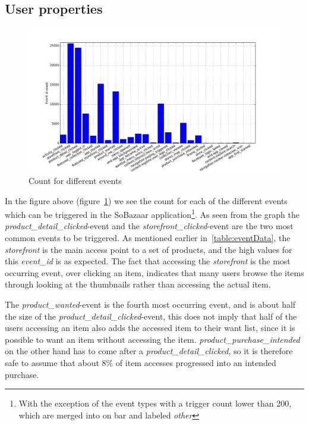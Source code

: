 \subsection{User properties}
    \begin{figure}[H]
        \includegraphics[width=5in]{image/event_iddistribution.png}
        \centering
        \caption{Count for different events}
    \label{figure:eventIDDistribution}
    \end{figure}
        In the figure above (figure~\ref{figure:eventIDDistribution}) we see the count for each of the different events which can be triggered in the SoBazaar application\footnote{With the exception of the event types with a trigger count lower than 200, which are merged into on bar and labeled \emph{other}}.
        As seen from the graph the \emph{product\_detail\_clicked}-event and the \emph{storefront\_clicked}-event are the two most common events to be triggered.
        As mentioned earlier in~\ref{table:eventData}, the \emph{storefront} is the main access point to a set of products, and the high values for this \emph{event\_id} is as expected.
        The fact that accessing the \emph{storefront} is the most occurring event, over clicking an item, indicates that many users browse the items through looking at the thumbnails rather than accessing the actual item.

        The \emph{product\_wanted}-event is the fourth most occurring event, and is about half the size of the \emph{product\_detail\_clicked}-event, this does not imply that half of the users accessing an item also adds the accessed item to their want list, since it is possible to want an item without accessing the item.
        \emph{product\_purchase\_intended} on the other hand has to come after a \emph{product\_detail\_clicked}, so it is therefore safe to assume that about 8\% of item accesses progressed into an intended purchase.

